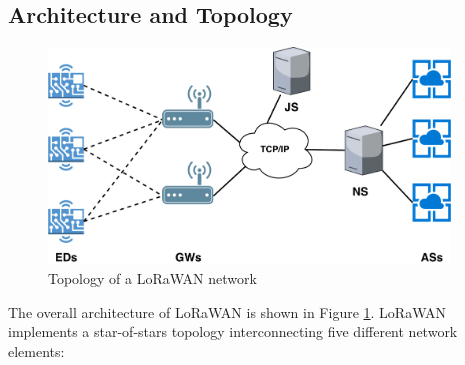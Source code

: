 %

\subsection{Architecture and Topology}

\begin{figure}[h]
    \centering
    \includegraphics[width=0.95\textwidth]{images/lora-topology.pdf}
    \caption{Topology of a LoRaWAN network}
    \label{fig:lorawan-architecture}
\end{figure}

The overall architecture of LoRaWAN is shown in Figure \ref{fig:lorawan-architecture}.
LoRaWAN implements a star-of-stars topology interconnecting five different network elements:

